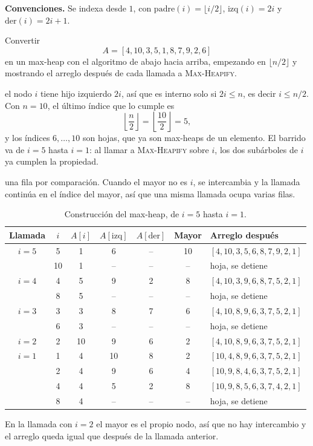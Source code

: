 \documentclass[11pt,letterpaper]{article}
\begin{document}

\noindent\textbf{Convenciones.}
Se indexa desde $1$, con $\mathrm{padre}(i) = \lfloor i/2
\rfloor$, $\mathrm{izq}(i) = 2i$ y $\mathrm{der}(i) = 2i + 1$.

\noindent Convertir
\[
  A = [4, 10, 3, 5, 1, 8, 7, 9, 2, 6]
\]
en un max-heap con el algoritmo de abajo hacia arriba, empezando en
$\lfloor n/2 \rfloor$ y mostrando el arreglo después de cada llamada a
\textsc{Max-Heapify}.

 el nodo $i$ tiene hijo izquierdo $2i$, así que
es interno solo si $2i \le n$, es decir $i \le n/2$. Con $n = 10$, el
último índice que lo cumple es
\[
  \left\lfloor \frac{n}{2} \right\rfloor
  = \left\lfloor \frac{10}{2} \right\rfloor = 5,
\]
y los índices $6, \ldots, 10$ son hojas, que ya son max-heaps de un
elemento. El barrido va de $i = 5$ hasta $i = 1$: al llamar a
\textsc{Max-Heapify} sobre $i$, los dos subárboles de $i$ ya cumplen
la propiedad.

 una fila por comparación. Cuando el mayor no es $i$, se
intercambia y la llamada continúa en el índice del mayor, así que una
misma llamada ocupa varias filas.

\begin{table}[H]
  \centering
  \begin{tabular}{ccccccl}
    \toprule
    \textbf{Llamada} & $i$ & $A[i]$ & $A[\mathrm{izq}]$
      & $A[\mathrm{der}]$ & \textbf{Mayor}
      & \textbf{Arreglo después} \\
    \midrule
    $i = 5$ & 5  & 1 & 6  & -- & 10
      & $[4, 10, 3, 5, 6, 8, 7, 9, 2, 1]$ \\
            & 10 & 1 & -- & -- & --
      & hoja, se detiene \\
    \midrule
    $i = 4$ & 4  & 5 & 9  & 2  & 8
      & $[4, 10, 3, 9, 6, 8, 7, 5, 2, 1]$ \\
            & 8  & 5 & -- & -- & --
      & hoja, se detiene \\
    \midrule
    $i = 3$ & 3  & 3 & 8  & 7  & 6
      & $[4, 10, 8, 9, 6, 3, 7, 5, 2, 1]$ \\
            & 6  & 3 & -- & -- & --
      & hoja, se detiene \\
    \midrule
    $i = 2$ & 2  & 10 & 9 & 6  & 2
      & $[4, 10, 8, 9, 6, 3, 7, 5, 2, 1]$ \\
    \midrule
    $i = 1$ & 1  & 4 & 10 & 8  & 2
      & $[10, 4, 8, 9, 6, 3, 7, 5, 2, 1]$ \\
            & 2  & 4 & 9  & 6  & 4
      & $[10, 9, 8, 4, 6, 3, 7, 5, 2, 1]$ \\
            & 4  & 4 & 5  & 2  & 8
      & $[10, 9, 8, 5, 6, 3, 7, 4, 2, 1]$ \\
            & 8  & 4 & -- & -- & --
      & hoja, se detiene \\
    \bottomrule
  \end{tabular}
  \caption{Construcción del max-heap, de $i = 5$ hasta $i = 1$.}
  \label{ej18:ej18-traza}
\end{table}

En la llamada con $i = 2$ el mayor es el propio nodo, así que no hay
intercambio y el arreglo queda igual que después de la llamada
anterior.

\respuesta{[10, 9, 8, 5, 6, 3, 7, 4, 2, 1]}
\end{document}
